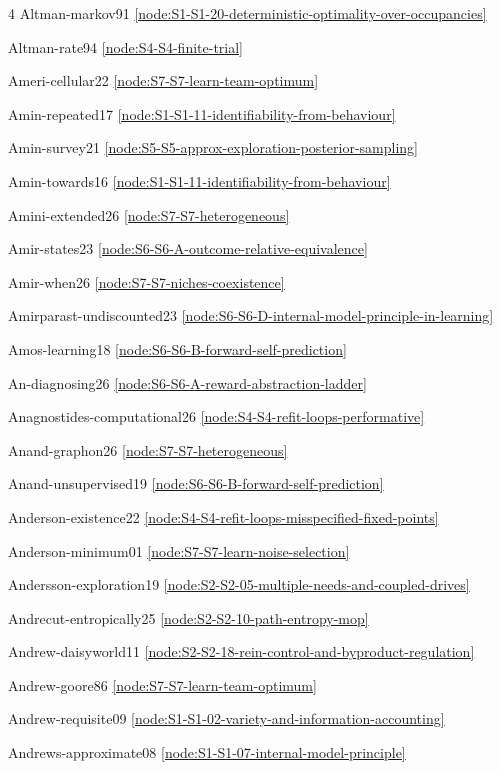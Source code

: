 \documentclass[10pt]{article}
\begin{document}
{\begin{multicols}{4}
Altman-markov91 \hfill \ref{node:S1-S1-20-deterministic-optimality-over-occupancies}\par
Altman-rate94 \hfill \ref{node:S4-S4-finite-trial}\par
Ameri-cellular22 \hfill \ref{node:S7-S7-learn-team-optimum}\par
Amin-repeated17 \hfill \ref{node:S1-S1-11-identifiability-from-behaviour}\par
Amin-survey21 \hfill \ref{node:S5-S5-approx-exploration-posterior-sampling}\par
Amin-towards16 \hfill \ref{node:S1-S1-11-identifiability-from-behaviour}\par
Amini-extended26 \hfill \ref{node:S7-S7-heterogeneous}\par
Amir-states23 \hfill \ref{node:S6-S6-A-outcome-relative-equivalence}\par
Amir-when26 \hfill \ref{node:S7-S7-niches-coexistence}\par
Amirparast-undiscounted23 \hfill \ref{node:S6-S6-D-internal-model-principle-in-learning}\par
Amos-learning18 \hfill \ref{node:S6-S6-B-forward-self-prediction}\par
An-diagnosing26 \hfill \ref{node:S6-S6-A-reward-abstraction-ladder}\par
Anagnostides-computational26 \hfill \ref{node:S4-S4-refit-loops-performative}\par
Anand-graphon26 \hfill \ref{node:S7-S7-heterogeneous}\par
Anand-unsupervised19 \hfill \ref{node:S6-S6-B-forward-self-prediction}\par
Anderson-existence22 \hfill \ref{node:S4-S4-refit-loops-misspecified-fixed-points}\par
Anderson-minimum01 \hfill \ref{node:S7-S7-learn-noise-selection}\par
Andersson-exploration19 \hfill \ref{node:S2-S2-05-multiple-needs-and-coupled-drives}\par
Andrecut-entropically25 \hfill \ref{node:S2-S2-10-path-entropy-mop}\par
Andrew-daisyworld11 \hfill \ref{node:S2-S2-18-rein-control-and-byproduct-regulation}\par
Andrew-goore86 \hfill \ref{node:S7-S7-learn-team-optimum}\par
Andrew-requisite09 \hfill \ref{node:S1-S1-02-variety-and-information-accounting}\par
Andrews-approximate08 \hfill \ref{node:S1-S1-07-internal-model-principle}\par

\end{multicols}}
\end{document}
